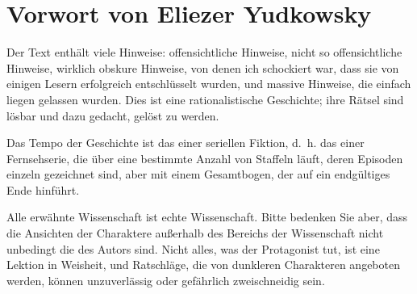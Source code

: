 \chapter*{Vorwort von Eliezer Yudkowsky}


Der Text enthält viele Hinweise: offensichtliche Hinweise, nicht so offensichtliche Hinweise, wirklich obskure Hinweise, von denen ich schockiert war, dass sie von einigen Lesern erfolgreich entschlüsselt wurden, und massive Hinweise, die einfach liegen gelassen wurden. Dies ist eine rationalistische Geschichte; ihre Rätsel sind lösbar und dazu gedacht, gelöst zu werden.

Das Tempo der Geschichte ist das einer seriellen Fiktion, d.~h. das einer Fernsehserie, die über eine bestimmte Anzahl von Staffeln läuft, deren Episoden einzeln gezeichnet sind, aber mit einem Gesamtbogen, der auf ein endgültiges Ende hinführt.

Alle erwähnte Wissenschaft ist echte Wissenschaft. Bitte bedenken Sie aber, dass die Ansichten der Charaktere außerhalb des Bereichs der Wissenschaft nicht unbedingt die des Autors sind. Nicht alles, was der Protagonist tut, ist eine Lektion in Weisheit, und Ratschläge, die von dunkleren Charakteren angeboten werden, können unzuverlässig oder gefährlich zweischneidig sein.

